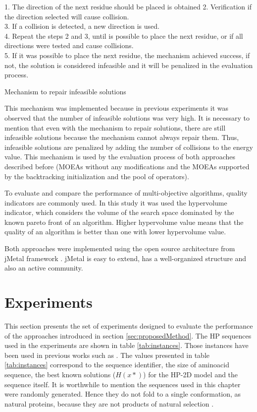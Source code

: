 \begin{algorithm}[h]
	1. The direction of the next residue should be placed is obtained 
	2. Verification if the direction selected will cause collision.\\
	3. If a collision is detected, a new direction is used.\\
	4. Repeat the steps 2 and 3, until is possible to place the next residue, or if all directions were tested and cause collisions.\\
	5. If it was possible to place the next residue, the mechanism achieved success, if not, the solution is considered infeasible and it will be penalized in the evaluation process.
	\caption{Mechanism to repair infeasible solutions}
	\label{algo:reparacao}
\end{algorithm}


This mechanism was implemented because in previous experiments it was observed that the number of infeasible solutions was very high. It is necessary to mention that even with the mechanism to repair solutions, there are still infeasible solutions because the mechanism cannot always repair them. Thus, infeasible solutions are penalized by adding the number of collisions to the energy value. This mechanism is used by the evaluation process of both approaches described before (MOEAs without any modifications and the MOEAs supported by the backtracking initialization and the pool of operators).

To evaluate and compare the performance of multi-objective algorithms, quality indicators are commonly used. In this study it was used the hypervolume indicator, which considers the volume of the search space dominated by the known pareto front \cite{zitzler2003performance} of an algorithm. Higher hypervolume value means that the quality of an algorithm is better than one with lower hypervolume value.


Both approaches were implemented using the open source architecture from  jMetal framework \cite{durillo2011jmetal}.  jMetal is easy to extend, has a well-organized structure and also an active community. 


\section{Experiments} \label{sec:experiments}


This section presents the set of experiments designed to evaluate the performance of the approaches introduced in section \ref{sec:proposedMethod}. The HP sequences used in the experiments are shown in table \ref{tab:instances}. Those instances have been used in previous works such as \cite{bastolla1997testing,shmygelska2002ant,unger1993genetic,cotta2003protein, santana2004protein,shmygelska2003improved,lesh2003complete}. The values presented in table \ref{tab:instances} correspond to the sequence identifier, the size of aminoacid sequence, the best known solutions ($H(x*)$) for the HP-2D model and the sequence itself. It is worthwhile to mention the sequences used in this chapter were randomly generated. Hence they do not fold to a single conformation, as natural proteins, because they are not products of natural selection \cite{chan2001perspectives}.

